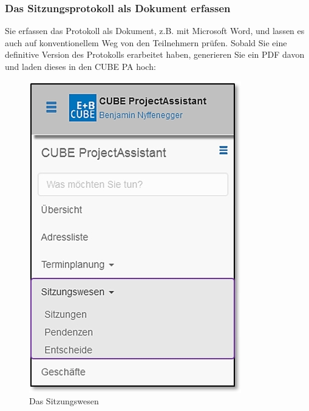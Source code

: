 \subsubsection{Das Sitzungsprotokoll als Dokument erfassen}

Sie erfassen das Protokoll als Dokument, z.B. mit Microsoft Word, und lassen es auch auf konventionellem Weg von den Teilnehmern prüfen. Sobald Sie eine definitive Version des Protokolls erarbeitet haben, generieren Sie ein PDF davon und laden dieses in den CUBE PA hoch:

\vspace{\baselineskip}

\begin{figure}   %
  \vspace{-35pt}      %
  \begin{center}
    \includegraphics[width=1\linewidth]{../chapters/05_Sitzungswesen/pictures/5-1_Menu_Sitzungswesen.jpg}
  \end{center}
  \vspace{-20pt}
  \caption{Das Sitzungswesen}
  \vspace{-10pt}
\end{figure}

